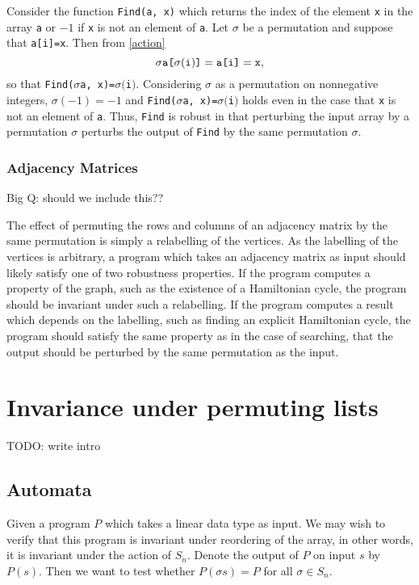 \documentclass{llncs}
\begin{document}
    Consider the function \verb!Find(a, x)! which returns the index of the element
    \verb!x! in the array \verb!a! or \(-1\) if \verb!x! is not an element of
    \verb!a!.  Let \(\sigma\) be a permutation and suppose that \verb!a[i]=x!.  Then
    from \eqref{action} \[\sigma\verb!a[!\sigma(\verb!i!)\verb!]! = \verb!a[i]! =
    \verb!x!,\] so that \verb!Find(!\(\sigma\)\verb!a, x)=!\(\sigma(\)\verb!i!\()\).
    Considering \(\sigma\) as a permutation on nonnegative integers, \(\sigma(-1) =
    -1\) and \verb!Find(!\(\sigma\)\verb!a, x)=!\(\sigma(\)\verb!i!\()\) holds even
    in the case that \verb!x! is not an element of \verb!a!.  Thus, \verb!Find! is
    robust in that perturbing the input array by a permutation \(\sigma\) perturbs
    the output of \verb!Find! by the same permutation \(\sigma\).

  \subsubsection{Adjacency Matrices}

    Big Q: should we include this??

    The effect of permuting the rows and columns of an adjacency matrix by the same
    permutation is simply a relabelling of the vertices.  As the labelling of the
    vertices is arbitrary, a program which takes an adjacency matrix as input should
    likely satisfy one of two robustness properties.  If the program computes a
    property of the graph, such as the existence of a Hamiltonian cycle, the program
    should be invariant under such a relabelling.  If the program computes a result
    which depends on the labelling, such as finding an explicit Hamiltonian cycle,
    the program should satisfy the same property as in the case of searching, that
    the output should be perturbed by the same permutation as the input.


\section{Invariance under permuting lists}
\label{permlists}

  TODO: write intro

  \subsection{Automata}
    Given a program $P$ which takes a linear data type
    as input. We may wish to verify that this program
    is invariant under reordering of the array,
    in other words, it is invariant under the action of $S_n$.
    Denote the output of $P$ on input $s$ by $P(s)$.
    Then we want to test whether $P(\sigma s) = P$
    for all $\sigma \in S_n$.
\end{document}
